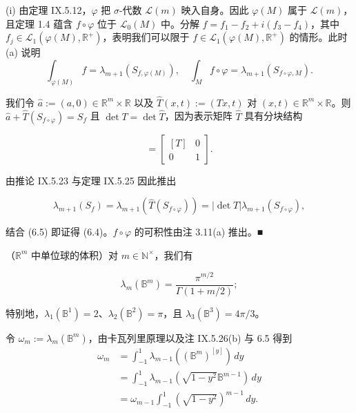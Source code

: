 \begin{example}
\begin{items}
\proofhead
(i) 由定理 IX.5.12，$ \varphi $ 把 $ \sigma $-代数 $ \mathcal{L}(m) $ 映入自身。因此 $ \varphi(M) $ 属于 $ \mathcal{L}(m) $，且定理 1.4 蕴含 $ f \circ \varphi $ 位于 $ \mathcal{L}_{0}(M) $ 中。分解 $ f = f_1 - f_2 + i(f_3 - f_4) $，其中 $ f_j \in \mathcal{L}_{1}(\varphi(M), \mathbb{R}^{+}) $，表明我们可以限于 $ f \in \mathcal{L}_{1}(\varphi(M), \mathbb{R}^{+}) $ 的情形。此时 (a) 说明
\begin{equation}
\int_{\varphi(M)} f = \lambda_{m+1}(S_{f,\varphi(M)}) , \quad \int_{M} f \circ \varphi = \lambda_{m+1}(S_{f \circ \varphi, M}) .\tag{6.5}
\end{equation}

\begin{subitems}
\item

我们令 $ \hat{a} := (a, 0) \in \mathbb{R}^m \times \mathbb{R} $ 以及 $ \hat{T}(x, t) := (Tx, t) $ 对 $ (x, t) \in \mathbb{R}^m \times \mathbb{R} $。则 $ \hat{a} + \hat{T}(S_{f \circ \varphi}) = S_f $ 且 $ \det T = \det \hat{T} $，因为表示矩阵 $ \hat{T} $ 具有分块结构

\begin{equation*}
[\hat{T}] = \begin{bmatrix} [T] & 0 \\ 0 & 1 \end{bmatrix} .
\end{equation*}

由推论 IX.5.23 与定理 IX.5.25 因此推出

\[
\lambda_{m+1}(S_f) = \lambda_{m+1}(\hat{T}(S_{f \circ \varphi})) = |\det T| \lambda_{m+1}(S_{f \circ \varphi}) ,
\]

结合 (6.5) 即证得 (6.4)。$ f \circ \varphi $ 的可积性由注 3.11(a) 推出。\nobreak\hspace{0.35em}■

\end{subitems}

\item[（c）]

（$ \mathbb{R}^m $ 中单位球的体积）对 $ m \in \mathbb{N}^{\times} $，我们有

\[
\lambda_m(\mathbb{B}^m) = \frac{\pi^{m/2}}{\Gamma(1 + m/2)} ;
\]

特别地，$ \lambda_1(\mathbb{B}^1) = 2 $、$ \lambda_2(\mathbb{B}^2) = \pi $，且 $ \lambda_3(\mathbb{B}^3) = 4\pi/3 $。

\proofhead
令 $ \omega_m := \lambda_m(\mathbb{B}^m) $，由卡瓦列里原理以及注 IX.5.26(b) 与 6.5 得到
\begin{equation*}
\begin{aligned}
\omega_m &= \int_{-1}^{1} \lambda_{m-1}((\mathbb{B}^m)^{[y]}) \, dy \\ &= \int_{-1}^{1} \lambda_{m-1}(\sqrt{1 - y^2} \mathbb{B}^{m-1}) \, dy \\ &= \omega_{m-1} \int_{-1}^{1} (\sqrt{1 - y^2})^{m-1} \, dy .
\end{aligned}
\end{equation*}
\end{items}


\end{example}
